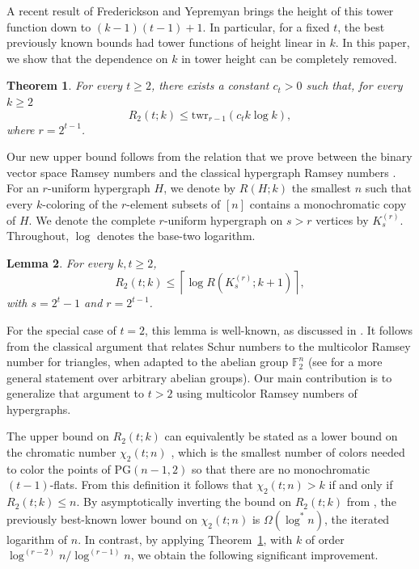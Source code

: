\documentclass[a4paper,11pt]{amsproc}
\theoremstyle{plain}
\newtheorem{Theorem} {Theorem} [section]
\newtheorem{Lemma} [Theorem] {Lemma}
\theoremstyle{definition}
\begin{document}
A recent result of Frederickson and Yepremyan \cite{FredericksonYepremyan} brings the height of this tower function down to $(k - 1)(t - 1) + 1$. 
In particular, for a fixed $t$, the best previously known bounds had tower functions of height linear in $k$. 
In this paper, we show that the dependence on $k$ in tower height can be completely removed. 

\begin{Theorem}
\label{thm:main1}
    For every $t \geq 2$, there exists a constant $c_t > 0$ such that, for every $k \geq 2$
    \[R_2(t; k) \leq \mathrm{twr}_{r - 1}(c_t k \log k),\]
    where $r = 2^{t - 1}$. 
\end{Theorem}

Our new upper bound follows from the relation that we prove between the binary vector space Ramsey numbers and the classical hypergraph Ramsey numbers \cite{MubayiSukSurvey}. 
For an $r$-uniform hypergraph $H$, we denote by $R(H; k)$ the smallest $n$ such that every $k$-coloring of the $r$-element subsets of $[n]$ contains a monochromatic copy of $H$. 
We denote the complete $r$-uniform hypergraph on $s > r$ vertices by $K_s^{(r)}$.
Throughout, $\log$ denotes the base-two logarithm.

\begin{Lemma}
    For every $k, t \geq 2$, 
    \[R_2(t; k) \leq \left\lceil \log R(K_s^{(r)}; k + 1) \right\rceil,\]
    with $s = 2^t - 1$ and $r = 2^{t - 1}$.
\end{Lemma}

For the special case of $t = 2$, this lemma is well-known, as discussed in \cite{BishnoiCamesVanBatenburgRavi}. 
It follows from the classical argument that relates Schur numbers to the multicolor Ramsey number for triangles, when adapted to the abelian group $\mathbb{F}_2^n$ (see \cite{AbbottHanson1972} for a more general statement over arbitrary abelian groups). 
Our main contribution is to generalize that argument to $t > 2$ using multicolor Ramsey numbers of hypergraphs.

The upper bound on $R_2(t; k)$ can equivalently be stated as a lower bound on the chromatic number $\chi_2(t; n)$ \cite{BishnoiCamesVanBatenburgRavi}, which is the smallest number of colors needed to color the points of $\mathrm{PG}(n - 1, 2)$ so that there are no monochromatic $(t - 1)$-flats. 
From this definition it follows that $\chi_2(t; n) > k$ if and only if $R_2(t; k) \leq n$. 
By asymptotically inverting the bound on $R_2(t; k)$ from \cite{FredericksonYepremyan}, the previously best-known lower bound on $\chi_2(t; n)$ is $\Omega(\log^*n)$, the iterated logarithm of $n$. In contrast, by applying Theorem~\ref{thm:main1}, with $k$ of order $\log^{(r - 2)} n/\log^{(r - 1)} n$, we obtain the following significant improvement. 
\end{document}
